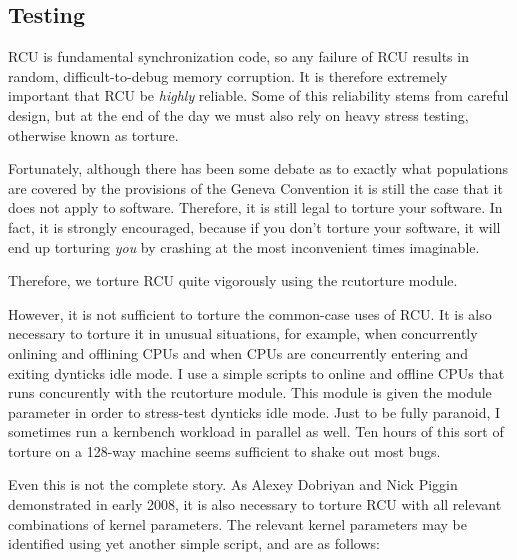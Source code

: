 \subsection{Testing}
\label{app:rcuimpl:rcutree:Testing}

RCU is fundamental synchronization code, so any failure of RCU
results in random, difficult-to-debug memory corruption.
It is therefore extremely important that RCU be \emph{highly} reliable.
Some of this reliability stems from careful design, but at the
end of the day we must also rely on heavy stress testing, otherwise
known as torture.

Fortunately, although there has been some debate as to exactly
what populations are covered by the provisions of the Geneva Convention
it is still the case that it does not apply to software.
Therefore, it is still legal to torture your software.
In fact, it is strongly encouraged, because if you don't torture your
software, it will end up torturing \emph{you} by crashing at the most
inconvenient times imaginable.

Therefore, we torture RCU quite vigorously using the rcutorture module.

However, it is not sufficient to torture the common-case uses of RCU.
It is also necessary to torture it in unusual situations, for example,
when concurrently onlining and offlining CPUs and when CPUs are concurrently
entering and exiting dynticks idle mode.
I use a simple scripts to online and offline CPUs that runs concurently
with the rcutorture module.
This module is given the  module parameter in order
to stress-test dynticks idle mode.
Just to be fully paranoid, I sometimes run a kernbench workload in parallel
as well.
Ten hours of this sort of torture on a 128-way machine seems sufficient
to shake out most bugs.

Even this is not the complete story.
As Alexey Dobriyan and Nick Piggin demonstrated in early 2008, it is
also necessary to torture RCU with all relevant combinations of kernel
parameters.
The relevant kernel parameters may be identified using yet another
simple script, and are as follows:

